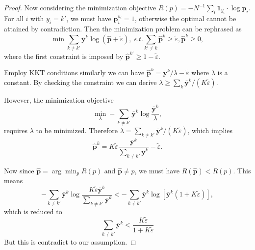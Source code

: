 \begin{proof}
Now considering the minimization objective $R(p) = - {N}^{-1} \sum_i \mathbf{1}_{y_i} \cdot \log \mathbf{p}_i$. For all $i$ with $y_i = k'$, we must have $\mathbf{p}_i^{y_i} = 1$, otherwise the optimal cannot be attained by contradiction. Then the minimization problem can be rephrased as
\begin{equation}
    \min \sum_{k\ne k'} \mathbf{\bar{y}}^k \log (\mathbf{\hat{p}} + \tilde{\varepsilon}), ~s.t. \sum_{k'\ne k} \mathbf{\hat{p}}^{k} \ge \tilde{\varepsilon}, \mathbf{\hat{p}}^{k} \ge 0,
\end{equation}
where the first constraint is imposed by $\mathbf{\hat{p}}^{k'} \ge 1 - \tilde{\varepsilon}$.


Employ KKT conditions similarly we can have $\mathbf{\hat{p}}^k = \mathbf{\bar{y}}^k/\lambda - \tilde{\varepsilon}$ where $\lambda$ is a constant. By checking the constraint we can derive $\lambda \ge \sum_k \mathbf{\bar{y}}^k / (K\tilde{\varepsilon})$.

However, the minimization objective 
$$
\min_{\lambda} - \sum_{k\ne k'} \mathbf{\bar{y}}^k \log \frac{\mathbf{\bar{y}}^k}{\lambda},
$$
requires $\lambda$ to be minimized. Therefore $\lambda = \sum_{k\ne k'} \mathbf{\bar{y}}^k / (K\tilde{\varepsilon})$, which implies
\begin{equation}
\mathbf{\hat{p}}^k = K\tilde{\varepsilon} \frac{\mathbf{\bar{y}}^k}{\sum_{k\ne k'} \mathbf{\bar{y}}^k} - \tilde{\varepsilon}.
\end{equation}

Now since $\mathbf{\hat{p}} = \arg\min_p R(p)$ and $\mathbf{\hat{p}} \ne p$, we must have $R(\mathbf{\hat{p}}) < R(p)$. This means
\begin{equation}
 - \sum_{k\ne k'} \mathbf{\bar{y}}^k \log \frac{K\tilde{\varepsilon} \mathbf{\bar{y}}^k}{\sum_{k\ne k'} \mathbf{\bar{y}}^k} < - \sum_{k\ne k'} \mathbf{\bar{y}}^k \log [\mathbf{\bar{y}}^k(1+K\tilde{\varepsilon})],
\end{equation}
which is reduced to
\begin{equation}
\sum_{k\ne k'}\mathbf{\bar{y}}^{k} < \frac{K\tilde{\varepsilon}}{1+K\tilde{\varepsilon}}
\end{equation}
But this is contradict to our assumption.
\end{proof}





